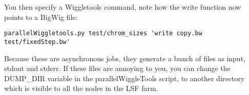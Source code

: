 \documentclass[12pt]{article}
\begin{document}
You then specify a Wiggletools command, note how the write function now points to a BigWig file:

\begin{verbatim}
parallelWiggletools.py test/chrom_sizes 'write copy.bw test/fixedStep.bw'
\end{verbatim}

Because these are asynchronous jobs, they generate a bunch of files as input, stdout and stderr. If these files are annoying to you, you can change the DUMP\_DIR variable in the parallelWiggleTools script, to another directory which is visible to all the nodes in the LSF farm.
\end{document}
